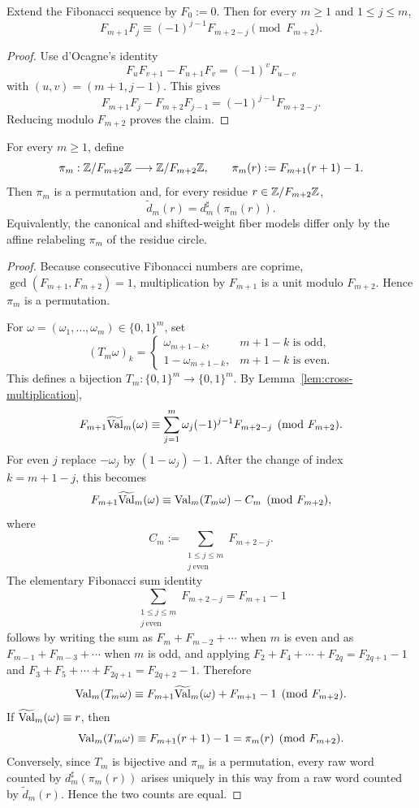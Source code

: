 \begin{lemma}\label{lem:cross-multiplication}
Extend the Fibonacci sequence by $F_0:=0$. Then for every $m\ge 1$ and $1\le j\le m$,
\[
F_{m+1}F_j \equiv (-1)^{j-1}F_{m+2-j}\pmod{F_{m+2}}.
\]
\end{lemma}

\begin{proof}
Use d'Ocagne's identity
\[
F_uF_{v+1}-F_{u+1}F_v = (-1)^vF_{u-v}
\]
with $(u,v)=(m+1,j-1)$. This gives
\[
F_{m+1}F_j-F_{m+2}F_{j-1}=(-1)^{j-1}F_{m+2-j}.
\]
Reducing modulo $F_{m+2}$ proves the claim.
\end{proof}

\begin{theorem}\label{thm:affine-transfer}
For every $m\ge1$, define
\[
\pi_m:\mathbb{Z}/F_{m+2}\mathbb{Z}\longrightarrow \mathbb{Z}/F_{m+2}\mathbb{Z},
\qquad
\pi_m(r):=F_{m+1}(r+1)-1.
\]
Then $\pi_m$ is a permutation and, for every residue
$r\in\mathbb{Z}/F_{m+2}\mathbb{Z}$,
\[
\widetilde d_m(r)=d_m^\sharp(\pi_m(r)).
\]
Equivalently, the canonical and shifted-weight fiber models differ only by
the affine relabeling $\pi_m$ of the residue circle.
\end{theorem}

\begin{proof}
Because consecutive Fibonacci numbers are coprime,
$\gcd(F_{m+1},F_{m+2})=1$, multiplication by $F_{m+1}$ is a unit modulo
$F_{m+2}$.  Hence $\pi_m$ is a permutation.

For $\omega=(\omega_1,\ldots,\omega_m)\in\{0,1\}^m$, set
\[
(T_m\omega)_k=
\begin{cases}
\omega_{m+1-k}, & m+1-k\text{ is odd},\\
1-\omega_{m+1-k}, & m+1-k\text{ is even}.
\end{cases}
\]
This defines a bijection $T_m:\{0,1\}^m\to\{0,1\}^m$.  By
Lemma~\ref{lem:cross-multiplication},
\[
F_{m+1}\widetilde{\mathrm{Val}}_m(\omega)
\equiv
\sum_{j=1}^m \omega_j(-1)^{j-1}F_{m+2-j}
\pmod {F_{m+2}}.
\]
For even $j$ replace $-\omega_j$ by $(1-\omega_j)-1$.  After the change of
index $k=m+1-j$, this becomes
\[
F_{m+1}\widetilde{\mathrm{Val}}_m(\omega)
\equiv
\mathrm{Val}_m(T_m\omega)-C_m
\pmod {F_{m+2}},
\]
where
\[
C_m:=\sum_{\substack{1\le j\le m\\ j\ \mathrm{even}}} F_{m+2-j}.
\]
The elementary Fibonacci sum identity
\[
\sum_{\substack{1\le j\le m\\ j\ \mathrm{even}}} F_{m+2-j}=F_{m+1}-1
\]
follows by writing the sum as
$F_{m}+F_{m-2}+\cdots$ when $m$ is even and as
$F_{m-1}+F_{m-3}+\cdots$ when $m$ is odd, and applying
$F_2+F_4+\cdots+F_{2q}=F_{2q+1}-1$ and
$F_3+F_5+\cdots+F_{2q+1}=F_{2q+2}-1$.  Therefore
\[
\mathrm{Val}_m(T_m\omega)
\equiv
F_{m+1}\widetilde{\mathrm{Val}}_m(\omega)+F_{m+1}-1
\pmod {F_{m+2}}.
\]
If $\widetilde{\mathrm{Val}}_m(\omega)\equiv r$, then
\[
\mathrm{Val}_m(T_m\omega)\equiv F_{m+1}(r+1)-1=\pi_m(r)
\pmod {F_{m+2}}.
\]
Conversely, since $T_m$ is bijective and $\pi_m$ is a permutation, every raw
word counted by $d_m^\sharp(\pi_m(r))$ arises uniquely in this way from a raw
word counted by $\widetilde d_m(r)$.  Hence the two counts are equal.
\end{proof}

